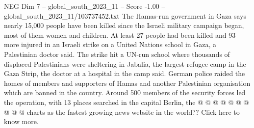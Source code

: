 \begin{textsample}{NEG Dim 7 – global\_south\_2023\_11 – Score -1.00 – global\_south\_2023\_11/103737452.txt}
The Hamas-run government in Gaza says nearly 15,000 people have been killed since the Israeli military campaign began, most of them women and children.
At least 27 people had been killed and 93 more injured in an Israeli strike on a United Nations school in Gaza, a Palestinian doctor said.
The strike hit a UN-run school where thousands of displaced Palestinians were sheltering in Jabalia, the largest refugee camp in the Gaza Strip, the doctor at a hospital in the camp said.
German police raided the homes of members and supporters of Hamas and another Palestinian organisation which are banned in the country.
Around 500 members of the security forces led the operation, with 13 places searched in the capital Berlin, the @ @ @ @ @ @ @ @ @ @ charts as the fastest growing news website in the world??
Click here to know more.

\end{textsample}
